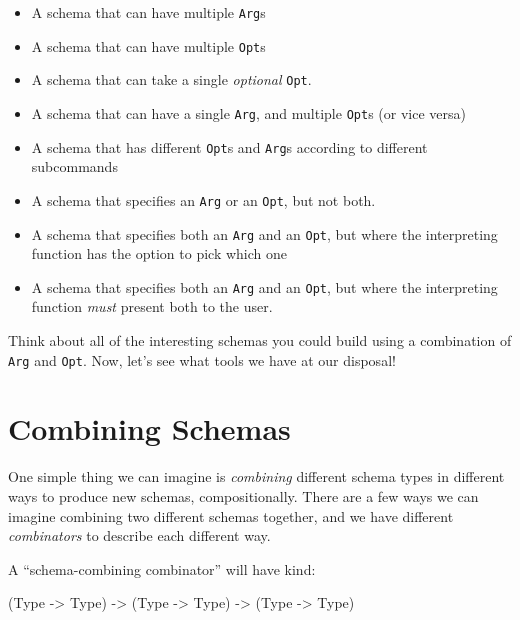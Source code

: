 \documentclass[]{article}
\newenvironment{Shaded}{}{}
\newcommand{\DataTypeTok}[1]{\textcolor[rgb]{0.56,0.13,0.00}{#1}}
\newcommand{\NormalTok}[1]{#1}
\newcommand{\OtherTok}[1]{\textcolor[rgb]{0.00,0.44,0.13}{#1}}
\begin{document}
\begin{itemize}
\item
  A schema that can have multiple \texttt{Arg}s
\item
  A schema that can have multiple \texttt{Opt}s
\item
  A schema that can take a single \emph{optional} \texttt{Opt}.
\item
  A schema that can have a single \texttt{Arg}, and multiple \texttt{Opt}s (or
  vice versa)
\item
  A schema that has different \texttt{Opt}s and \texttt{Arg}s according to
  different subcommands
\item
  A schema that specifies an \texttt{Arg} or an \texttt{Opt}, but not both.
\item
  A schema that specifies both an \texttt{Arg} and an \texttt{Opt}, but where
  the interpreting function has the option to pick which one
\item
  A schema that specifies both an \texttt{Arg} and an \texttt{Opt}, but where
  the interpreting function \emph{must} present both to the user.
\end{itemize}

Think about all of the interesting schemas you could build using a combination
of \texttt{Arg} and \texttt{Opt}. Now, let's see what tools we have at our
disposal!

\hypertarget{combining-schemas}{%
\section{Combining Schemas}\label{combining-schemas}}

One simple thing we can imagine is \emph{combining} different schema types in
different ways to produce new schemas, compositionally. There are a few ways we
can imagine combining two different schemas together, and we have different
\emph{combinators} to describe each different way.

A ``schema-combining combinator'' will have kind:

\begin{Shaded}
\begin{Highlighting}[]
\NormalTok{(}\DataTypeTok{Type} \OtherTok{{-}>} \DataTypeTok{Type}\NormalTok{) }\OtherTok{{-}>}\NormalTok{ (}\DataTypeTok{Type} \OtherTok{{-}>} \DataTypeTok{Type}\NormalTok{) }\OtherTok{{-}>}\NormalTok{ (}\DataTypeTok{Type} \OtherTok{{-}>} \DataTypeTok{Type}\NormalTok{)}
\end{Highlighting}
\end{Shaded}
\end{document}
